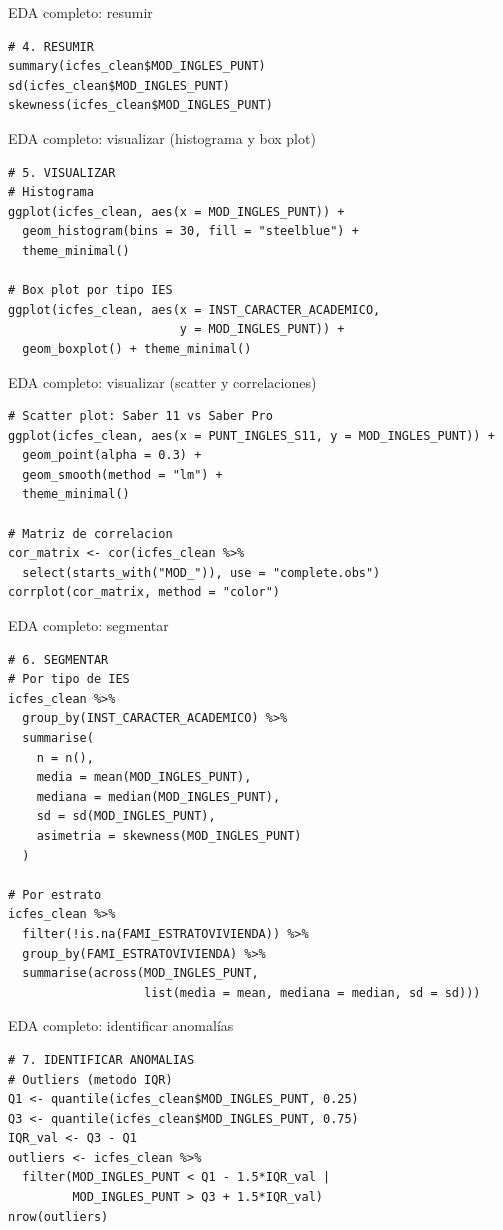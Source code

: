 \documentclass[aspectratio=169, 11pt]{beamer}
\begin{document}
\begin{frame}[fragile]{EDA completo: resumir}
\begin{lstlisting}
# 4. RESUMIR
summary(icfes_clean$MOD_INGLES_PUNT)
sd(icfes_clean$MOD_INGLES_PUNT)
skewness(icfes_clean$MOD_INGLES_PUNT)
\end{lstlisting}
\end{frame}

\begin{frame}[fragile]{EDA completo: visualizar (histograma y box plot)}
\begin{lstlisting}
# 5. VISUALIZAR
# Histograma
ggplot(icfes_clean, aes(x = MOD_INGLES_PUNT)) +
  geom_histogram(bins = 30, fill = "steelblue") +
  theme_minimal()

# Box plot por tipo IES
ggplot(icfes_clean, aes(x = INST_CARACTER_ACADEMICO,
                        y = MOD_INGLES_PUNT)) +
  geom_boxplot() + theme_minimal()
\end{lstlisting}
\end{frame}

\begin{frame}[fragile]{EDA completo: visualizar (scatter y correlaciones)}
\begin{lstlisting}
# Scatter plot: Saber 11 vs Saber Pro
ggplot(icfes_clean, aes(x = PUNT_INGLES_S11, y = MOD_INGLES_PUNT)) +
  geom_point(alpha = 0.3) +
  geom_smooth(method = "lm") +
  theme_minimal()

# Matriz de correlacion
cor_matrix <- cor(icfes_clean %>%
  select(starts_with("MOD_")), use = "complete.obs")
corrplot(cor_matrix, method = "color")
\end{lstlisting}
\end{frame}

\begin{frame}[fragile]{EDA completo: segmentar}
\begin{lstlisting}
# 6. SEGMENTAR
# Por tipo de IES
icfes_clean %>%
  group_by(INST_CARACTER_ACADEMICO) %>%
  summarise(
    n = n(),
    media = mean(MOD_INGLES_PUNT),
    mediana = median(MOD_INGLES_PUNT),
    sd = sd(MOD_INGLES_PUNT),
    asimetria = skewness(MOD_INGLES_PUNT)
  )

# Por estrato
icfes_clean %>%
  filter(!is.na(FAMI_ESTRATOVIVIENDA)) %>%
  group_by(FAMI_ESTRATOVIVIENDA) %>%
  summarise(across(MOD_INGLES_PUNT,
                   list(media = mean, mediana = median, sd = sd)))
\end{lstlisting}
\end{frame}

\begin{frame}[fragile]{EDA completo: identificar anomalías}
\begin{lstlisting}
# 7. IDENTIFICAR ANOMALIAS
# Outliers (metodo IQR)
Q1 <- quantile(icfes_clean$MOD_INGLES_PUNT, 0.25)
Q3 <- quantile(icfes_clean$MOD_INGLES_PUNT, 0.75)
IQR_val <- Q3 - Q1
outliers <- icfes_clean %>%
  filter(MOD_INGLES_PUNT < Q1 - 1.5*IQR_val |
         MOD_INGLES_PUNT > Q3 + 1.5*IQR_val)
nrow(outliers)
\end{lstlisting}
\end{frame}
\end{document}
